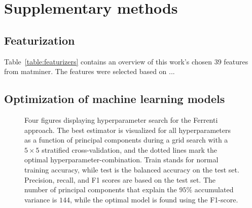\documentclass[superscriptaddress,unsortedaddress,
 amsmath,amssymb,
 aps,
]{revtex4-2}
\begin{document}
\section*{Supplementary methods}
\subsection*{Featurization}
Table~\ref{table:featurizers} contains an overview of this work's chosen 39 features from matminer. The features were selected based on ... 



\subsection*{Optimization of machine learning models}
\begin{figure}[ht!]
  \begin{subfigure}[b]{0.5\textwidth}
    
    \caption{}
    \label{fig:q1-LOG}
  \end{subfigure}%
    \hfill
  \begin{subfigure}[b]{0.5\textwidth}
    
    \caption{}
    \label{fig:q1-DT}
  \end{subfigure}
  
  \begin{subfigure}[b]{0.5\textwidth}
    
    \caption{}
    \label{fig:q1-RF}
  \end{subfigure}%
   \hfill
  \begin{subfigure}[b]{0.5\textwidth}
    
    \caption{}
    \label{fig:q1-GB}
  \end{subfigure}
  \caption{{Four figures displaying hyperparameter search for the Ferrenti approach. The best estimator is visualized for all hyperparameters as a function of principal components during a grid search with a $5\times5$ stratified cross-validation, and the dotted lines mark the optimal hyperparameter-combination. Train stands for normal training accuracy, while test is the balanced accuracy on the test set. Precision, recall, and F1 scores are based on the test set. The number of principal components that explain the $95\%$ accumulated variance is $144$, while the optimal model is found using the F1-score.}}
  \label{fig:01-pca}
\end{figure}
\end{document}

